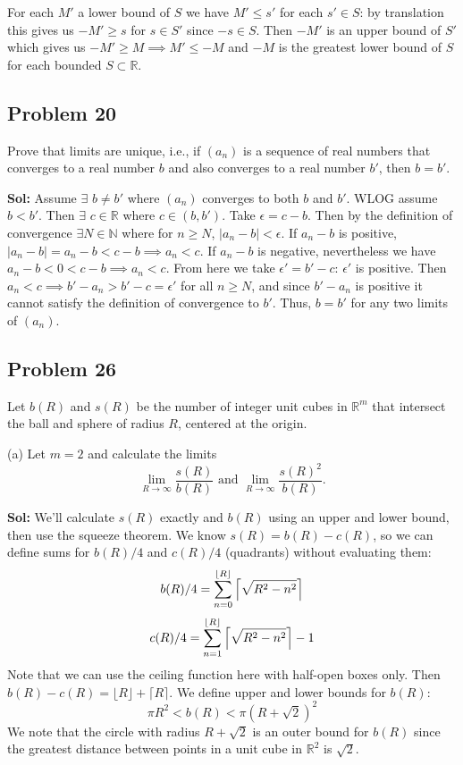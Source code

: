 \documentclass{amsart}
\begin{document}
\medskip
\noindent For each $M'$ a lower bound of $S$ we have $M'\leq s'$
for each $s'\in S$: by translation this gives us $-M'\geq s$ for $s\in S'$ since $-s\in S$. Then $-M'$ is
an upper bound of $S'$ which gives us $-M'\geq M\implies M'\leq -M$ and $-M$ is the greatest lower bound of $S$ for each 
bounded $S\subset\mathbb{R}$.


\newpage
\subsection*{Problem 20}
\noindent Prove that limits are unique, i.e., if $(a_n)$ is a sequence of real numbers that converges to a 
real number $b$ and also converges to a real number $b'$, then $b=b'$.

\medskip
\noindent \textbf{Sol:} Assume $\exists$ $b\neq b'$ where $(a_n)$ converges to both $b$ and $b'$. WLOG assume $b<b'$. Then
$\exists$ $c\in\mathbb{R}$ where $c\in (b, b')$. Take $\epsilon = c-b$. Then by the definition of convergence 
$\exists N\in\mathbb{N}$ where for $n\geq N$, $|a_n-b|<\epsilon$. If $a_n-b$ is positive, $|a_n-b|=a_n-b<c-b\implies a_n<c$. 
If $a_n-b$ is negative, nevertheless we have $a_n-b<0<c-b\implies a_n<c$. From here we take $\epsilon'= b'-c$: $\epsilon'$
is positive. Then $a_n<c\implies b'-a_n>b'-c=\epsilon'$ for all $n\geq N$, and since $b'-a_n$ is positive it cannot satisfy the
definition of convergence to $b'$. Thus, $b=b'$ for any two limits of $(a_n)$.







\newpage
\subsection*{Problem 26}
\noindent Let $b(R)$ and $s(R)$ be the number of integer unit cubes in $\mathbb{R}^m$ that intersect the ball
and sphere of radius $R$, centered at the origin.

\indent (a) Let $m=2$ and calculate the limits $$\lim_{R\rightarrow\infty}\frac{s(R)}{b(R)} \text{ and } \lim_{R\rightarrow\infty}\frac{s(R)^2}{b(R)}.$$ 

\medskip
\noindent \textbf{Sol:} We'll calculate $s(R)$ exactly and $b(R)$ using an upper and lower bound, then use the squeeze theorem.
We know $s(R)=b(R)-c(R)$, so we can define sums for $b(R)/4$ and $c(R)/4$ (quadrants) without evaluating them: $$b(R)/4=\sum_{n=0}^{\lfloor R\rfloor}\Big{\lceil}\sqrt{R^2-n^2}\Big{\rceil}$$
$$c(R)/4=\sum_{n=1}^{\lfloor R\rfloor}\Big{\lceil}\sqrt{R^2-n^2}\Big{\rceil}-1$$
Note that we can use the ceiling function here with half-open boxes only. Then $b(R)-c(R)=\lfloor R\rfloor + \lceil R\rceil$. We define upper and lower bounds for $b(R)$:
$$\pi R^2 < b(R) < \pi (R+\sqrt{2})^2$$ We note that the circle with radius $R+\sqrt{2}$ is an outer bound for $b(R)$ since the greatest distance between points in a unit cube in $\mathbb{R}^2$ is $\sqrt{2}$.
\end{document}
